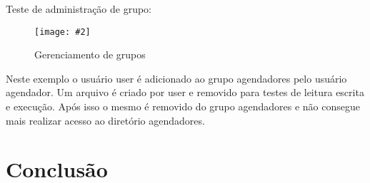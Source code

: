 \documentclass[
	12pt,				%
	openany,			%
	a4paper,			%
	chapter=TITLE,		%
	section=TITLE,		%
	english,
	brazil				%
]{abntex2}
\newcommand{\includeImage}[3] {

\begin{figure}[H]
 	 \centering
  		\texttt{[image: \#2]}
  	\caption{#3}
\end{figure}

}
\begin{document}
Teste de administração de grupo:

\includeImage{0.8}{imgs/5_gerenciamento_grupos/permissao_restringida_apenas_para_os_grupos.png}{Gerenciamento de grupos}

Neste exemplo o usuário user é adicionado ao grupo agendadores pelo usuário agendador. Um arquivo é criado por user e removido para testes de leitura escrita e execução. Após isso o mesmo é removido do grupo agendadores e não consegue mais realizar acesso ao diretório agendadores.

\chapter{Conclusão}
\end{document}
